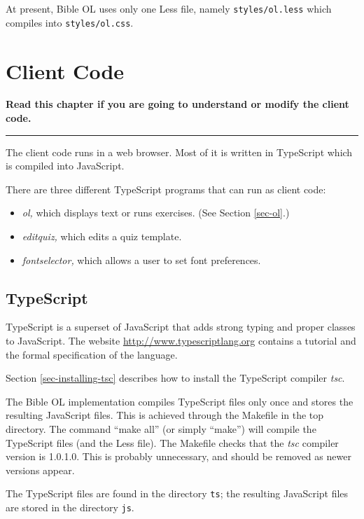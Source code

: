 \documentclass[11pt,oneside,a4paper]{memoir}
\begin{document}
At present, Bible OL uses only one Less file, namely \texttt{styles/ol.less} which compiles into
\texttt{styles/ol.css}.

\chapter{Client Code}\label{chap-client-code}

\textbf{Read this chapter if you are going to understand or modify the client code.}
\plainbreak{3}

The client code runs in a web browser. Most of it is written in TypeScript which is compiled into
JavaScript. 

There are three different TypeScript programs that can run as client code:


\begin{itemize}
\item \emph{ol,} which displays text or runs exercises. (See Section \ref{sec-ol}.)
\item \emph{editquiz,} which edits a quiz template.
\item \emph{fontselector,} which allows a user to set font preferences.
\end{itemize}

\section{TypeScript}\label{sec-typescript-use}

TypeScript is a superset of JavaScript that adds strong typing and proper classes to JavaScript.
The website \url{http://www.typescriptlang.org} contains a tutorial and the formal specification of
the language.

Section \ref{sec-installing-tsc} describes how to install the TypeScript compiler \emph{tsc}.

The Bible OL implementation
compiles TypeScript files only once and stores the resulting JavaScript files. This is achieved through the
Makefile in the top directory. The command ``make all'' (or simply ``make'') will compile the
TypeScript files (and the Less file). The Makefile checks that the \emph{tsc} compiler version is 1.0.1.0. This
is probably unnecessary, and should be removed as newer versions appear.

The TypeScript files are found in the directory \texttt{ts}; the resulting JavaScript files are
stored in the directory \texttt{js}.
\end{document}
